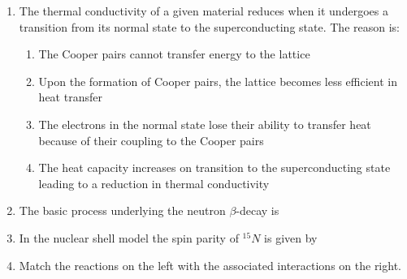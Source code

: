 \documentclass[journal,12pt,onecolumn]{IEEEtran}
\theoremstyle{remark}
\begin{document}
\begin{enumerate}
\item The thermal conductivity of a given material reduces when it undergoes a transition from its normal state to the superconducting state. The reason is:\hfill{}

\begin{enumerate}
	\item The Cooper pairs cannot transfer energy to the lattice
	\item Upon the formation of Cooper pairs, the lattice becomes less efficient in heat transfer
	\item The electrons in the normal state lose their ability to transfer heat because of their coupling to the Cooper pairs
	\item The heat capacity increases on transition to the superconducting state leading to a reduction in thermal conductivity
\end{enumerate}

\item The basic process underlying the neutron $\beta$-decay is\hfill{}

\begin{enumerate}  \end{enumerate}

\item In the nuclear shell model the spin parity of ${}^{15}N$ is given by\hfill{}

\begin{enumerate}  \end{enumerate}

\item Match the reactions on the left with the associated interactions on the right.\hfill{}


\end{enumerate}
\end{document}
